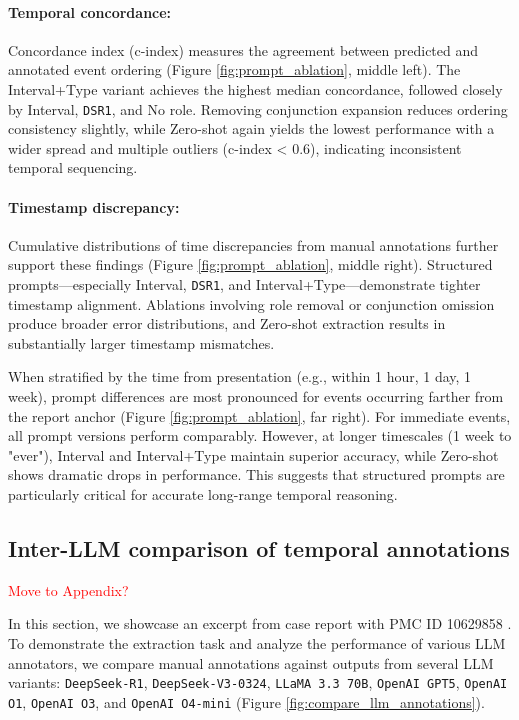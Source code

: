 \paragraph{Temporal concordance:} Concordance index (c-index) measures the agreement between predicted and annotated event ordering (Figure \ref{fig:prompt_ablation}, middle left). The Interval+Type variant achieves the highest median concordance, followed closely by Interval, \texttt{DSR1}, and No role. Removing conjunction expansion reduces ordering consistency slightly, while Zero-shot again yields the lowest performance with a wider spread and multiple outliers (c-index < 0.6), indicating inconsistent temporal sequencing.

\paragraph{Timestamp discrepancy:} Cumulative distributions of time discrepancies from manual annotations further support these findings (Figure \ref{fig:prompt_ablation}, middle right). Structured prompts—especially Interval, \texttt{DSR1}, and Interval+Type—demonstrate tighter timestamp alignment. Ablations involving role removal or conjunction omission produce broader error distributions, and Zero-shot extraction results in substantially larger timestamp mismatches.

When stratified by the time from presentation (e.g., within 1 hour, 1 day, 1 week), prompt differences are most pronounced for events occurring farther from the report anchor (Figure \ref{fig:prompt_ablation}, far right). For immediate events, all prompt versions perform comparably. However, at longer timescales (1 week to "ever"), Interval and Interval+Type maintain superior accuracy, while Zero-shot shows dramatic drops in performance. This suggests that structured prompts are particularly critical for accurate long-range temporal reasoning.


\subsection{Inter-LLM comparison of temporal annotations} \textcolor{red}{Move to Appendix?}

In this section, we showcase an excerpt from case report with PMC ID 10629858 \citep{abu2023rare}. To demonstrate the extraction task and analyze the performance of various LLM annotators, we compare manual annotations against outputs from several LLM variants: \texttt{DeepSeek-R1}, \texttt{DeepSeek-V3-0324}, \texttt{LLaMA 3.3 70B}, \texttt{OpenAI GPT5}, \texttt{OpenAI O1}, \texttt{OpenAI O3}, and \texttt{OpenAI O4-mini} (Figure \ref{fig:compare_llm_annotations}).

